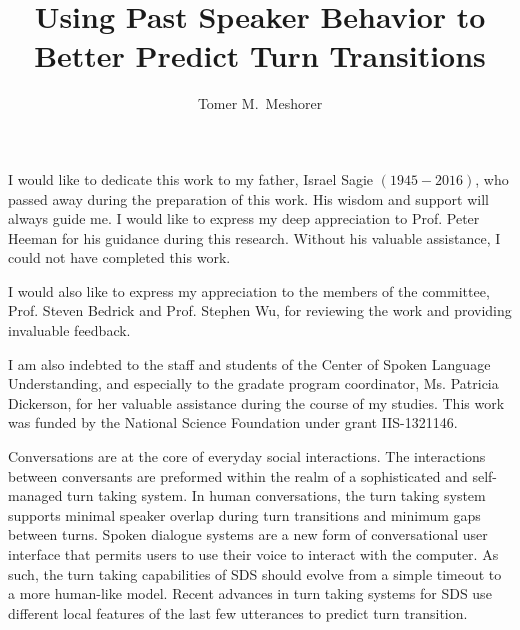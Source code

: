 \documentclass[copyright,masters]{cslu-thesis}
\begin{document}
\title{Using Past Speaker Behavior to Better Predict Turn Transitions}
\author{Tomer M.\ Meshorer}


\frontmatter


I would like to dedicate this work to my father, Israel Sagie $(1945-2016)$, who passed away during the preparation of this work.
His wisdom and support will always guide me.
I would like to express my deep appreciation to Prof. Peter Heeman for his guidance during this research. Without his valuable assistance,
I could not have completed this work.

I would also like to express my appreciation to the members of the committee, Prof. Steven Bedrick and Prof. Stephen Wu, for reviewing
the work and providing invaluable feedback.

I am also indebted to the staff and students of the Center of Spoken Language Understanding, and especially to the gradate program coordinator, Ms. Patricia Dickerson,
for her valuable assistance during the course of my studies.
This work was funded by the National Science Foundation under grant IIS-1321146.


\tableofcontents


\abstract
 Conversations are at the core of everyday social interactions. The interactions between conversants are preformed within the realm of a sophisticated and self-managed turn taking system. In human conversations, the turn taking system  supports minimal speaker overlap during turn transitions and minimum gaps between turns. Spoken dialogue systems are a new form of conversational user interface that permits users to use their voice to interact with the computer. As such, the turn taking capabilities of SDS should evolve from a simple timeout to a more human-like model. Recent advances in turn taking systems for SDS use different local features of the last few utterances to predict turn transition.
\end{document}
